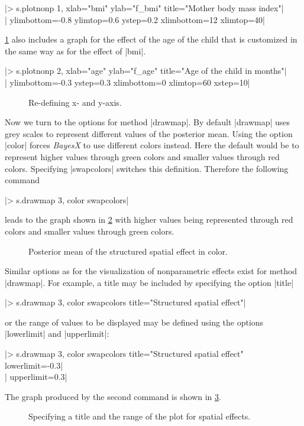 |> s.plotnonp 1, xlab="bmi" ylab="f_bmi" title="Mother body mass index"|\\
|  ylimbottom=-0.8 ylimtop=0.6 ystep=0.2 xlimbottom=12 xlimtop=40|

\ref{step:bmi6} also includes a graph for the effect of the age of the child that is customized in the same way as for the
effect of |bmi|.

|> s.plotnonp 2, xlab="age" ylab="f_age" title="Age of the child in months"|\\
|  ylimbottom=-0.3  ystep=0.3 xlimbottom=0 xlimtop=60 xstep=10|

\begin{figure}[ht]
\begin{center}
{\it\caption{Re-defining x- and y-axis.\label{step:bmi6}}}
\end{center}
\end{figure}

Now we turn to the options for method |drawmap|. By default |drawmap| uses grey scales to represent different values of the
posterior mean. Using the option |color| forces {\it BayesX} to use different colors instead. Here the default would be to
represent higher values through green colors and smaller values through red colors. Specifying |swapcolors| switches this
definition. Therefore the following command

|> s.drawmap 3, color swapcolors|

leads to the graph shown in \ref{step:spat3} with higher values being represented through red colors and smaller values through
green colors.

\begin{figure}[ht]
\begin{center}
{\it\caption{Posterior mean of the structured spatial effect in
color.\label{step:spat3}}}
\end{center}
\end{figure}

Similar options as for the visualization of nonparametric effects exist for method |drawmap|. For example, a title may be
included by specifying the option |title|

|> s.drawmap 3, color swapcolors title="Structured spatial effect"|

or the range of values to be displayed may be defined using the options |lowerlimit| and |upperlimit|:

|> s.drawmap 3, color swapcolors title="Structured spatial effect" lowerlimit=-0.3|\\
|  upperlimit=0.3|

The graph produced by the second command is shown in \ref{step:spat4}.

\begin{figure}[ht]
\begin{center}
{\it\caption{Specifying a title and the range of the plot for
spatial effects.\label{step:spat4}}}
\end{center}
\end{figure}

